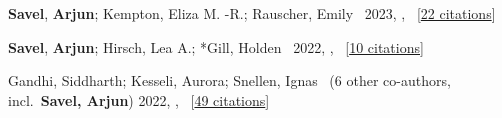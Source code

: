 





\item[{\color{numcolor}\scriptsize20}] \textbf{Savel}, \textbf{Arjun}; Kempton, Eliza M. -R.; Rauscher, Emily \etal\ 2023, , \apj\ [\href{https://ui.adsabs.harvard.edu/abs/2023ApJ...944...99S}{22 citations}]


\item[{\color{numcolor}\scriptsize18}] \textbf{Savel}, \textbf{Arjun}; Hirsch, Lea A.; *Gill, Holden \etal\ 2022, , \pasp\ [\href{https://ui.adsabs.harvard.edu/abs/2022PASP..134l4501S}{10 citations}]

\item[{\color{numcolor}\scriptsize15}] Gandhi, Siddharth; Kesseli, Aurora; Snellen, Ignas \etal\ ({6} other co-authors, incl.\ \textbf{Savel, Arjun}) 2022, , \mnras\ [\href{https://ui.adsabs.harvard.edu/abs/2022MNRAS.515..749G}{49 citations}]


